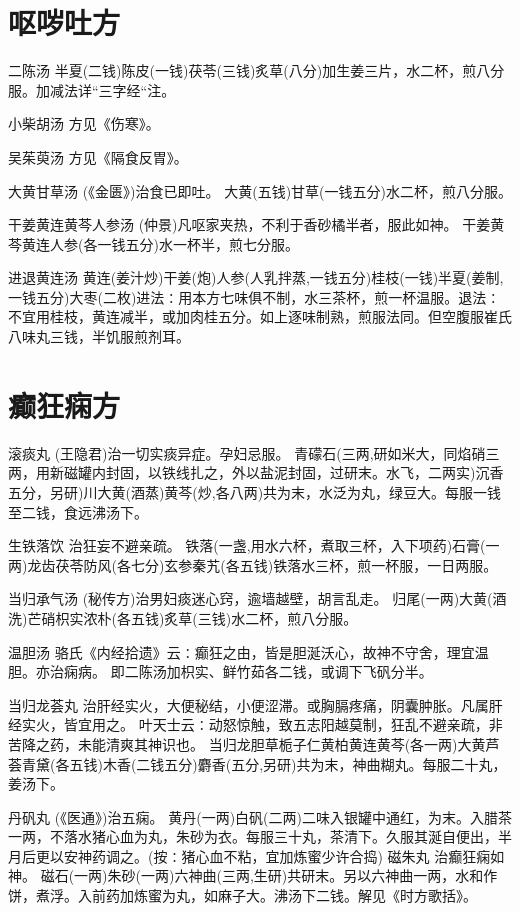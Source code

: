 \documentclass[a4paper,12pt,UTF8,twoside]{ctexbook}
\begin{document}
	

	\chapter{呕哕吐方}
	
	
	二陈汤
	半夏(二钱)陈皮(一钱)茯苓(三钱)炙草(八分)加生姜三片，水二杯，煎八分服。加减法详“三字经“注。
	
	小柴胡汤
	方见《伤寒》。
	
	吴茱萸汤
	方见《隔食反胃》。
	
	大黄甘草汤
	(《金匮》)治食已即吐。
	大黄(五钱)甘草(一钱五分)水二杯，煎八分服。
	
	干姜黄连黄芩人参汤
	(仲景)凡呕家夹热，不利于香砂橘半者，服此如神。
	干姜黄芩黄连人参(各一钱五分)水一杯半，煎七分服。
	
	进退黄连汤
	黄连(姜汁炒)干姜(炮)人参(人乳拌蒸,一钱五分)桂枝(一钱)半夏(姜制,一钱五分)大枣(二枚)进法∶用本方七味俱不制，水三茶杯，煎一杯温服。退法∶不宜用桂枝，黄连减半，或加肉桂五分。如上逐味制熟，煎服法同。但空腹服崔氏八味丸三钱，半饥服煎剂耳。
	
	
	
	
	\chapter{癫狂痫方}
	
	
	滚痰丸
	(王隐君)治一切实痰异症。孕妇忌服。
	青礞石(三两,研如米大，同焰硝三两，用新磁罐内封固，以铁线扎之，外以盐泥封固，过研末。水飞，二两实)沉香五分，另研)川大黄(酒蒸)黄芩(炒,各八两)共为末，水泛为丸，绿豆大。每服一钱至二钱，食远沸汤下。
	
	生铁落饮
	治狂妄不避亲疏。
	铁落(一盏,用水六杯，煮取三杯，入下项药)石膏(一两)龙齿茯苓防风(各七分)玄参秦艽(各五钱)铁落水三杯，煎一杯服，一日两服。
	
	当归承气汤
	(秘传方)治男妇痰迷心窍，逾墙越壁，胡言乱走。
	归尾(一两)大黄(酒洗)芒硝枳实浓朴(各五钱)炙草(三钱)水二杯，煎八分服。
	
	温胆汤
	骆氏《内经拾遗》云∶癫狂之由，皆是胆涎沃心，故神不守舍，理宜温胆。亦治痫病。
	即二陈汤加枳实、鲜竹茹各二钱，或调下飞矾分半。
	
	当归龙荟丸
	治肝经实火，大便秘结，小便涩滞。或胸膈疼痛，阴囊肿胀。凡属肝经实火，皆宜用之。
	叶天士云∶动怒惊触，致五志阳越莫制，狂乱不避亲疏，非苦降之药，未能清爽其神识也。
	当归龙胆草栀子仁黄柏黄连黄芩(各一两)大黄芦荟青黛(各五钱)木香(二钱五分)麝香(五分,另研)共为末，神曲糊丸。每服二十丸，姜汤下。
	
	丹矾丸
	(《医通》)治五痫。
	黄丹(一两)白矾(二两)二味入银罐中通红，为末。入腊茶一两，不落水猪心血为丸，朱砂为衣。每服三十丸，茶清下。久服其涎自便出，半月后更以安神药调之。(按∶猪心血不粘，宜加炼蜜少许合捣)
	磁朱丸
	治癫狂痫如神。
	磁石(一两)朱砂(一两)六神曲(三两,生研)共研末。另以六神曲一两，水和作饼，煮浮。入前药加炼蜜为丸，如麻子大。沸汤下二钱。解见《时方歌括》。
	
\end{document}
